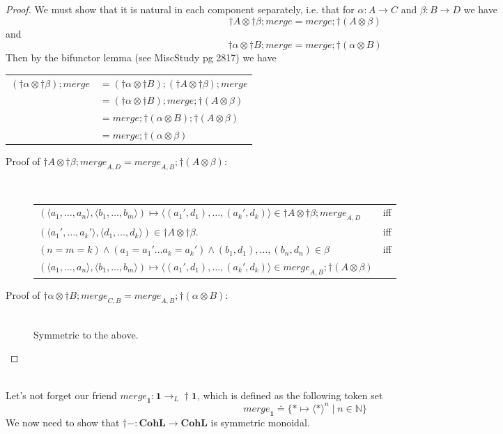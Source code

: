\documentclass{article}
\newcommand{\mbf}{\mathbf}
\begin{document}
\begin{proof}
We must show that it is natural in each component separately, i.e. that for $\alpha : A \to C$ and $\beta : B \to D$ we have $$\dagger A \otimes \dagger \beta;\mathit{merge} = \mathit{merge};\dagger(A \otimes \beta)$$
and $$\dagger \alpha \otimes \dagger B;\mathit{merge} = \mathit{merge};\dagger(\alpha \otimes B)$$
Then by the bifunctor lemma (see MiscStudy pg 2817) we have~\\

\begin{tabular}{ll}
$(\dagger \alpha \otimes \dagger \beta);\mathit{merge}$ & $= (\dagger \alpha \otimes \dagger B);(\dagger A \otimes \dagger \beta);\mathit{merge}$ \\
 ~ & $= (\dagger \alpha \otimes \dagger B);\mathit{merge};\dagger(A \otimes \beta)$ \\
 ~ & $= \mathit{merge};\dagger(\alpha \otimes B);\dagger(A \otimes \beta)$ \\
 ~ & $= \mathit{merge};\dagger(\alpha \otimes \beta)$
\end{tabular}

\begin{description}

\item[Proof of $\dagger A \otimes \dagger \beta;\mathit{merge}_{A, D} = \mathit{merge}_{A, B};\dagger(A \otimes \beta)$:]~\\

\begin{tabular}{ll}
$(\langle a_1, \ldots, a_n \rangle, \langle b_1, \ldots, b_m \rangle) \mapsto \langle (a_1', d_1), \ldots, (a_k',d_k) \rangle \in \dagger A \otimes \dagger \beta;\mathit{merge}_{A, D}$ & iff \\
$(\langle a_1', \ldots, a_k' \rangle,\langle d_1, \ldots, d_k \rangle) \in \dagger A \otimes \dagger \beta.~$  & iff \\
$(n = m = k) \wedge (a_1 = a_1' \ldots a_k = a_k') \wedge (b_1,d_1),\ldots,(b_n,d_n) \in \beta$ & iff \\
$(\langle a_1, \ldots, a_n \rangle, \langle b_1, \ldots, b_m \rangle) \mapsto \langle (a_1', d_1), \ldots, (a_k',d_k) \rangle \in \mathit{merge}_{A, B};\dagger(A \otimes \beta)$ & ~
   
\end{tabular}

\item[Proof of $\dagger \alpha \otimes \dagger B;\mathit{merge}_{C,B} = \mathit{merge}_{A,B};\dagger(\alpha \otimes B)$:]~\\

Symmetric to the above.

\end{description}

\end{proof}~\\
Let's not forget our friend $\mathit{merge}_{\mbf{1}} : \mbf{1} \to_L \dagger \mbf{1}$, 
which is defined as the following token set
$$\mathit{merge}_{\mbf{1}} \doteq \{ \ast \mapsto \langle \ast \rangle^n \mid n \in \mathbb N \} $$
We now need to show that $\dagger - : \mbf{CohL} \to \mbf{CohL}$ is symmetric monoidal. 
\end{document}
